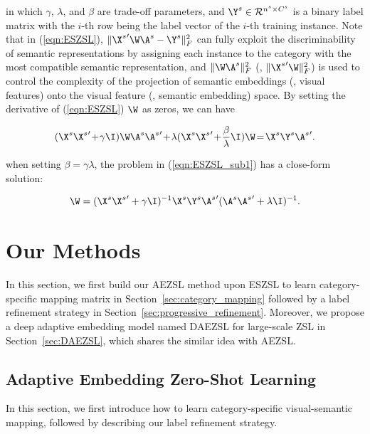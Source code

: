 \documentclass[journal]{IEEEtran}
\begin{document}
\noindent in which $\gamma$, $\lambda$, and $\beta$ are trade-off parameters, and $\Y^s\in\mathcal{R}^{n^s\times C^s}$ is a binary label matrix with the $i$-th row being the label vector of the $i$-th training instance. Note that in (\ref{eqn:ESZSL}),
$\|{\X^s}'\W\A^s-\Y^s\|_F^2$ can fully exploit the discriminability of semantic representations by assigning each instance to the category with the most compatible semantic representation, and $\|\W\A^s\|_F^2$ (\resp, $\|{\X^s}'\W\|_F^2$) is used to control the complexity of the projection of semantic embeddings (\resp, visual features) onto the visual feature (\resp, semantic embedding) space. By setting the derivative of (\ref{eqn:ESZSL}) \wrt $\W$ as zeros, we can have

\vspace{-15pt}
\begin{eqnarray} \label{eqn:ESZSL_sub1}
(\X^s{\X^s}'\!+\!\gamma\I)\W\A^s{\A^s}'\!+\! \lambda(\X^s{\X^s}'\!+\!\frac{\beta}{\lambda}\I)\W\!=\!\X^s\Y^s{\A^s}'.
\end{eqnarray}

\noindent when setting $\beta=\gamma\lambda$, the problem in (\ref{eqn:ESZSL_sub1}) has a close-form solution:

\vspace{-15pt}
\begin{eqnarray} \W=(\X^s{\X^s}'+\gamma\I)^{-1}\X^s\Y^s{\A^s}'
(\A^s{\A^s}'+\lambda\I)^{-1}.
\end{eqnarray}

\section{Our Methods} \label{sec:ours}
In this section, we first build our AEZSL method upon ESZSL to learn category-specific mapping matrix in Section~\ref{sec:category_mapping} followed by a label refinement strategy in Section~\ref{sec:progressive_refinement}. Moreover, we propose a deep adaptive embedding model named DAEZSL for large-scale ZSL in Section~\ref{sec:DAEZSL}, which shares the similar idea with AEZSL.

\subsection{Adaptive Embedding Zero-Shot Learning}
In this section, we first introduce how to learn category-specific visual-semantic mapping, followed by describing our label refinement strategy.
\end{document}

